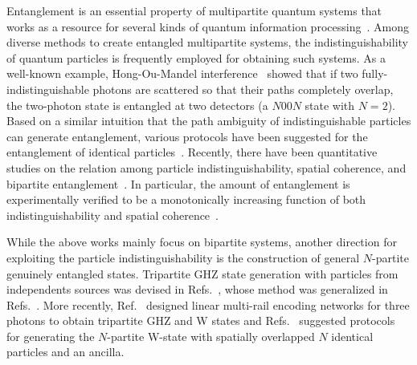 \documentclass[a4paper,twocolumn,8pt,accepted=2021-12-15]{quantumarticle}
\begin{document}
	
	
	
	Entanglement is an essential property of multipartite quantum systems that works as a resource for several kinds of quantum information processing~\cite{horodecki2009quantum}. Among diverse methods to create entangled multipartite systems, the indistinguishability of quantum particles is frequently employed for obtaining such systems. As a well-known example, Hong-Ou-Mandel interference~\cite{hong1987measurement} showed that if two fully-indistinguishable photons are scattered so that their paths completely overlap, the two-photon state is entangled at two detectors (a $N00N$ state with $N=2$). Based on a similar intuition that the path ambiguity of indistinguishable particles can generate entanglement, various protocols have been suggested for the entanglement of identical  particles~\cite{tichy2013entanglement,killoran2014extracting,krenn2017entanglement, paunkovic2004role}. Recently, there have been quantitative studies on the relation among  particle indistinguishability, spatial coherence, and bipartite entanglement~\cite{franco2018indistinguishability, chin2019entanglement, nosrati2020robust, barros:20, chin2021taming}. In particular, the amount of entanglement is experimentally verified to be a monotonically increasing function of both indistinguishability and spatial coherence~\cite{barros:20}.
	
	While the above works mainly focus on bipartite systems, another direction for exploiting the particle indistinguishability is the construction of general $N$-partite genuinely entangled states.  Tripartite GHZ state generation with particles from independents sources was devised in Refs.~\cite{yurke1992einstein,yurke1992bell}, whose method was generalized in Refs.~\cite{zukowski1993event,zukowski1995entangling,zeilinger1997three}. More recently, Ref.~\cite{blasiak2019entangling} designed linear multi-rail encoding networks for three photons to obtain tripartite GHZ and W states and Refs.~\cite{bellomo2017n,kim2020efficient} suggested protocols for generating the $N$-partite W-state with spatially overlapped $N$ identical particles and an ancilla. 
	
\end{document}
